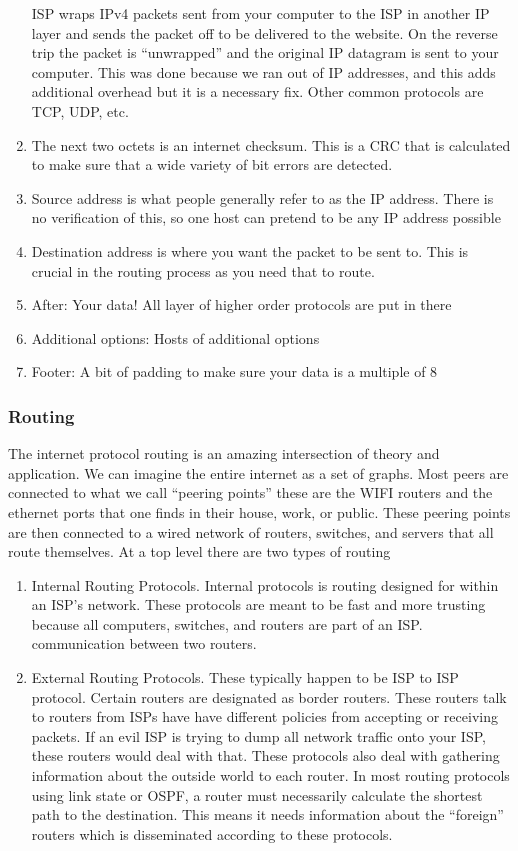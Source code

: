 \documentclass[]{article}
\begin{document}
\begin{enumerate}
  ISP wraps IPv4 packets sent from your computer to the ISP in another
  IP layer and sends the packet off to be delivered to the website. On
  the reverse trip the packet is ``unwrapped'' and the original IP
  datagram is sent to your computer. This was done because we ran out of
  IP addresses, and this adds additional overhead but it is a necessary
  fix. Other common protocols are TCP, UDP, etc.
\item
  The next two octets is an internet checksum. This is a CRC that is
  calculated to make sure that a wide variety of bit errors are
  detected.
\item
  Source address is what people generally refer to as the IP address.
  There is no verification of this, so one host can pretend to be any IP
  address possible
\item
  Destination address is where you want the packet to be sent to. This
  is crucial in the routing process as you need that to route.
\item
  After: Your data! All layer of higher order protocols are put in there
\item
  Additional options: Hosts of additional options
\item
  Footer: A bit of padding to make sure your data is a multiple of 8
\end{enumerate}

\subsubsection{Routing}\label{routing}

The internet protocol routing is an amazing intersection of theory and
application. We can imagine the entire internet as a set of graphs. Most
peers are connected to what we call ``peering points'' these are the
WIFI routers and the ethernet ports that one finds in their house, work,
or public. These peering points are then connected to a wired network of
routers, switches, and servers that all route themselves. At a top level
there are two types of routing

\begin{enumerate}
\item
  Internal Routing Protocols. Internal protocols is routing designed for
  within an ISP's network. These protocols are meant to be fast and more
  trusting because all computers, switches, and routers are part of an
  ISP. communication between two routers.
\item
  External Routing Protocols. These typically happen to be ISP to ISP
  protocol. Certain routers are designated as border routers. These
  routers talk to routers from ISPs have have different policies from
  accepting or receiving packets. If an evil ISP is trying to dump all
  network traffic onto your ISP, these routers would deal with that.
  These protocols also deal with gathering information about the outside
  world to each router. In most routing protocols using link state or
  OSPF, a router must necessarily calculate the shortest path to the
  destination. This means it needs information about the ``foreign''
  routers which is disseminated according to these protocols.
\end{enumerate}
\end{document}
